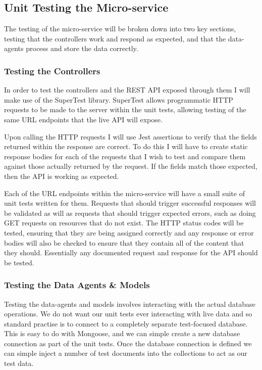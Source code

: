 \subsection{Unit Testing the Micro-service}
The testing of the micro-service will be broken down into two key sections, testing that the controllers work and respond as expected, and that the data-agents process and store the data correctly.
\subsubsection{Testing the Controllers}
In order to test the controllers and the REST API exposed through them I will make use of the SuperTest library. SuperTest allows programmatic HTTP requests to be made to the server within the unit tests, allowing testing of the same URL endpoints that the live API will expose.

Upon calling the HTTP requests I will use Jest assertions to verify that the fields returned within the response are correct. To do this I will have to create static response bodies for each of the requests that I wish to test and compare them against those actually returned by the request. If the fields match those expected, then the API is working as expected.

Each of the URL endpoints within the micro-service will have a small suite of unit tests written for them. Requests that should trigger successful responses will be validated as will as requests that should trigger expected errors, such as doing GET requests on resources that do not exist. The HTTP status codes will be tested, ensuring that they are being assigned correctly and any response or error bodies will also be checked to ensure that they contain all of the content that they should. Essentially any documented request and response for the API should be tested.
\subsubsection{Testing the Data Agents \& Models}
Testing the data-agents and models involves interacting with the actual database operations. We do not want our unit tests ever interacting with live data and so standard practise is to connect to a completely separate test-focused database. This is easy to do with Mongoose, and we can simple create a new database connection as part of the unit tests. Once the database connection is defined we can simple inject a number of test documents into the collections to act as our test data.


